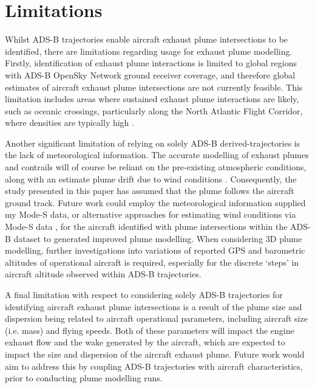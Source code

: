 \section{Limitations}
Whilst ADS-B trajectories enable aircraft exhaust plume intersections to be identified, there are limitations regarding usage for exhaust plume modelling. Firstly, identification of exhaust plume interactions is limited to global regions with ADS-B OpenSky Network ground receiver coverage, and therefore global estimates of aircraft exhaust plume intersections are not currently feasible. This limitation includes areas where sustained exhaust plume interactions are likely, such as oceanic crossings, particularly along the North Atlantic Flight Corridor, where densities are typically high \cite{Schlager1997}.

Another significant limitation of relying on solely ADS-B derived-trajectories is the lack of meteorological information. The accurate modelling of exhaust plumes and contrails will of course be reliant on the pre-existing atmospheric conditions, along with an estimate plume drift due to wind conditions \cite{Gruber2018}. Consequently, the study presented in this paper has assumed that the plume follows the aircraft ground track. Future work could employ the meteorological information supplied my Mode-S data, or alternative approaches for estimating wind conditions via Mode-S data \cite{Sun2018}, for the aircraft identified with plume intersections within the ADS-B dataset to generated improved plume modelling. When considering 3D plume modelling, further investigations into variations of reported GPS and barometric altitudes of operational aircraft is required, especially for the discrete ‘steps’ in aircraft altitude observed within ADS-B trajectories.

A final limitation with respect to considering solely ADS-B trajectories for identifying aircraft exhaust plume intersections is a result of the plume size and dispersion being related to aircraft operational parameters, including aircraft size (i.e. mass) and flying speeds. Both of these parameters will impact the engine exhaust flow and the wake generated by the aircraft, which are expected to impact the size and dispersion of the aircraft exhaust plume. Future work would aim to address this by coupling ADS-B trajectories with aircraft characteristics, prior to conducting plume modelling runs.